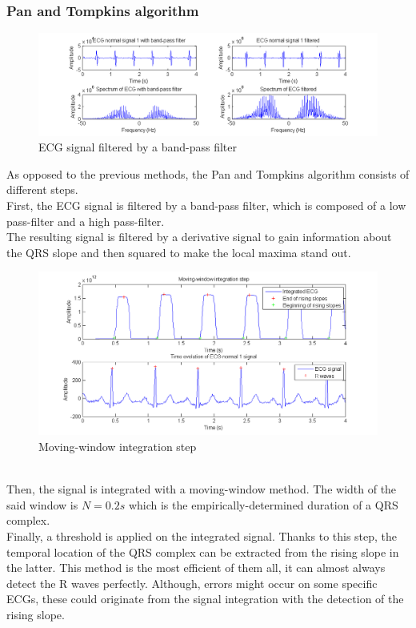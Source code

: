 \documentclass[11pt]{article}
\begin{document}
		\subsubsection{Pan and Tompkins algorithm}
			\begin{figure}[h]
				\centering
				\includegraphics[scale=0.5]{images/Q411_pt_2.png}
				\caption{ECG signal filtered by a band-pass filter}
				\label{Q411_pt_2}
			\end{figure}
			As opposed to the previous methods, the Pan and Tompkins algorithm consists of different steps.\\
			First, the ECG signal is filtered by a band-pass filter, which is composed of a low pass-filter and a high pass-filter.\\
			The resulting signal is filtered by a derivative signal to gain information about the QRS slope and then squared to make the local maxima stand out.\\
			\begin{figure}[h]
				\centering
				\includegraphics[scale=0.5]{images/Q411_pt_4.png}
				\caption{Moving-window integration step}
				\label{Q411_pt_4}
			\end{figure}
			\\
			Then, the signal is integrated with a moving-window method. The width of the said window is $N = 0.2 s$ which is the empirically-determined duration of a QRS complex.\\
			Finally, a threshold is applied on the integrated signal. Thanks to this step, the temporal location of the QRS complex can be extracted from the rising slope in the latter.
			This method is the most efficient of them all, it can almost always detect the R waves perfectly. Although, errors might occur on some specific ECGs, these could originate from the signal integration with the detection of the rising slope.\\
\end{document}
